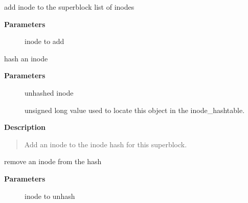 \documentclass[a4paper,8pt,english]{sphinxmanual}
\begin{document}
\begin{fulllineitems}
\label{filesystems/index:c.inode_sb_list_add}
add inode to the superblock list of inodes

\end{fulllineitems}


\textbf{Parameters}
\begin{description}
\item[{}] \leavevmode
inode to add

\end{description}

\begin{fulllineitems}
\label{filesystems/index:c.__insert_inode_hash}
hash an inode

\end{fulllineitems}


\textbf{Parameters}
\begin{description}
\item[{}] \leavevmode
unhashed inode

\item[{}] \leavevmode
unsigned long value used to locate this object in the
inode\_hashtable.

\end{description}

\textbf{Description}
\begin{quote}

Add an inode to the inode hash for this superblock.
\end{quote}

\begin{fulllineitems}
\label{filesystems/index:c.__remove_inode_hash}
remove an inode from the hash

\end{fulllineitems}


\textbf{Parameters}
\begin{description}
\item[{}] \leavevmode
inode to unhash

\end{description}
\end{document}
